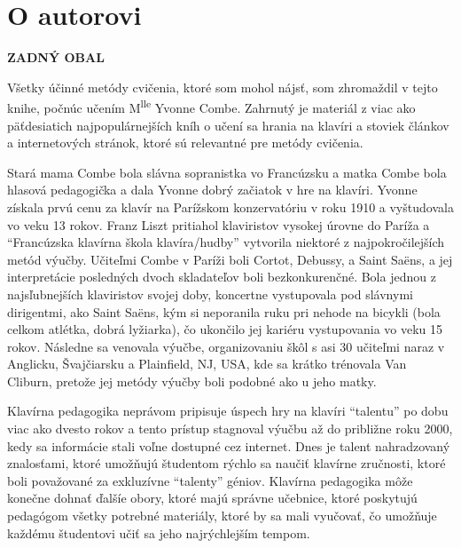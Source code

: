 \documentclass[11pt,a4paper]{book}
\begin{document}
\chapter*{O autorovi}\label{s:about-author}

{}
\printindex
\clearpage

\thispagestyle{empty}
\begin{center}
{\large\bf ZADNÝ OBAL}
\end{center}

\vspace*{2em}

Všetky účinné metódy cvičenia, ktoré som mohol nájsť, som zhromaždil v tejto knihe, počnúc učením M\textsuperscript{lle} Yvonne Combe. Zahrnutý je materiál z viac ako päťdesiatich najpopulárnejších kníh o učení sa hrania na klavíri a stoviek článkov a internetových stránok, ktoré sú relevantné pre metódy cvičenia.

Stará mama Combe bola slávna sopranistka vo Francúzsku a matka Combe bola hlasová pedagogička a dala Yvonne dobrý začiatok v hre na klavíri. Yvonne získala prvú cenu za klavír na Parížskom konzervatóriu v roku 1910 a vyštudovala vo veku 13 rokov. Franz Liszt pritiahol klaviristov vysokej úrovne do Paríža a “Francúzska klavírna škola klavíra/hudby” vytvorila niektoré z najpokročilejších metód výučby. Učiteľmi Combe v Paríži boli Cortot, Debussy, a Saint Saëns, a jej interpretácie posledných dvoch skladateľov boli bezkonkurenčné. Bola jednou z najsľubnejších klaviristov svojej doby, koncertne vystupovala pod slávnymi dirigentmi, ako Saint Saëns, kým si neporanila ruku pri nehode na bicykli (bola celkom atlétka, dobrá lyžiarka), čo ukončilo jej kariéru vystupovania vo veku 15 rokov. Následne sa venovala výučbe, organizovaniu škôl s asi 30 učiteľmi naraz v Anglicku, Švajčiarsku a Plainfield, NJ, USA, kde sa krátko trénovala Van Cliburn, pretože jej metódy výučby boli podobné ako u jeho matky.

Klavírna pedagogika neprávom pripisuje úspech hry na klavíri “talentu” po dobu viac ako dvesto rokov a tento prístup stagnoval výučbu až do približne roku 2000, kedy sa informácie stali voľne dostupné cez internet. Dnes je talent nahradzovaný znalosťami, ktoré umožňujú študentom rýchlo sa naučiť klavírne zručnosti, ktoré boli považované za exkluzívne “talenty” géniov. Klavírna pedagogika môže konečne dohnať ďalšíe obory, ktoré majú správne učebnice, ktoré poskytujú pedagógom všetky potrebné materiály, ktoré by sa mali vyučovať, čo umožňuje každému študentovi učiť sa jeho najrýchlejším tempom.
\end{document}

